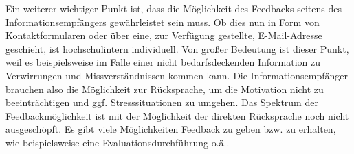 \documentclass{article}
\begin{document}
Ein weiterer wichtiger Punkt ist, dass die Möglichkeit des Feedbacks seitens des Informationsempfängers gewährleistet
sein muss. Ob dies nun in Form von Kontaktformularen oder über eine, zur Verfügung gestellte, E-Mail-Adresse geschieht,
ist hochschulintern individuell. Von großer Bedeutung ist dieser Punkt, weil es beispielsweise im Falle einer nicht
bedarfsdeckenden Information zu Verwirrungen und Missverständnissen kommen kann. Die Informationsempfänger brauchen
also die Möglichkeit zur Rücksprache, um die Motivation nicht zu beeinträchtigen und ggf. Stresssituationen zu umgehen.
\newline
Das Spektrum der Feedbackmöglichkeit ist mit der Möglichkeit der direkten Rücksprache noch nicht ausgeschöpft. Es gibt
viele Möglichkeiten Feedback zu geben bzw. zu erhalten, wie beispielsweise eine Evaluationsdurchführung o.ä..


\bigskip
\end{document}
